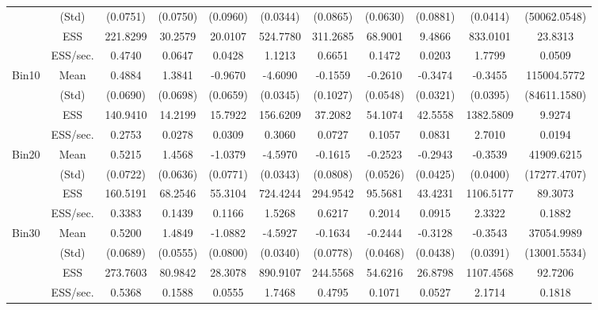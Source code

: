 {{{\begin{table}
\begin{tabular}{cc ccc ccc ccc}
 & (Std) 
 & (0.0751)  & (0.0750)  & (0.0960)  & (0.0344)  & (0.0865)  & (0.0630)  & (0.0881)  & (0.0414)  & (50062.0548)  \\  [0.75ex] 
 & ESS 
 & 221.8299  & 30.2579  & 20.0107  & 524.7780  & 311.2685  & 68.9001  & 9.4866  & 833.0101  & 23.8313  \\  [0.75ex] 
[468.01 s]  & ESS/sec. 
 & 0.4740  & 0.0647  & 0.0428  & 1.1213  & 0.6651  & 0.1472  & 0.0203  & 1.7799  & 0.0509  \\  [1.3ex] 
\rowcolor{LightCyan} 
Bin10 & Mean 
 & 0.4884  & 1.3841  & -0.9670  & -4.6090  & -0.1559  & -0.2610  & -0.3474  & -0.3455  & 115004.5772  \\  [0.75ex] 
 & (Std) 
 & (0.0690)  & (0.0698)  & (0.0659)  & (0.0345)  & (0.1027)  & (0.0548)  & (0.0321)  & (0.0395)  & (84611.1580)  \\  [0.75ex] 
 & ESS 
 & 140.9410  & 14.2199  & 15.7922  & 156.6209  & 37.2082  & 54.1074  & 42.5558  & 1382.5809  & 9.9274  \\  [0.75ex] 
[511.87 s]  & ESS/sec. 
 & 0.2753  & 0.0278  & 0.0309  & 0.3060  & 0.0727  & 0.1057  & 0.0831  & 2.7010  & 0.0194  \\  [1.3ex] 
\rowcolor{LightCyan} 
Bin20 & Mean 
 & 0.5215  & 1.4568  & -1.0379  & -4.5970  & -0.1615  & -0.2523  & -0.2943  & -0.3539  & 41909.6215  \\  [0.75ex] 
 & (Std) 
 & (0.0722)  & (0.0636)  & (0.0771)  & (0.0343)  & (0.0808)  & (0.0526)  & (0.0425)  & (0.0400)  & (17277.4707)  \\  [0.75ex] 
 & ESS 
 & 160.5191  & 68.2546  & 55.3104  & 724.4244  & 294.9542  & 95.5681  & 43.4231  & 1106.5177  & 89.3073  \\  [0.75ex] 
[474.46 s]  & ESS/sec. 
 & 0.3383  & 0.1439  & 0.1166  & 1.5268  & 0.6217  & 0.2014  & 0.0915  & 2.3322  & 0.1882  \\  [1.3ex] 
\rowcolor{LightCyan} 
Bin30 & Mean 
 & 0.5200  & 1.4849  & -1.0882  & -4.5927  & -0.1634  & -0.2444  & -0.3128  & -0.3543  & 37054.9989  \\  [0.75ex] 
 & (Std) 
 & (0.0689)  & (0.0555)  & (0.0800)  & (0.0340)  & (0.0778)  & (0.0468)  & (0.0438)  & (0.0391)  & (13001.5534)  \\  [0.75ex] 
 & ESS 
 & 273.7603  & 80.9842  & 28.3078  & 890.9107  & 244.5568  & 54.6216  & 26.8798  & 1107.4568  & 92.7206  \\  [0.75ex] 
[510.02 s]  & ESS/sec. 
 & 0.5368  & 0.1588  & 0.0555  & 1.7468  & 0.4795  & 0.1071  & 0.0527  & 2.1714  & 0.1818  \\  [1.3ex] 

\end{tabular}
\end{table}}}}
